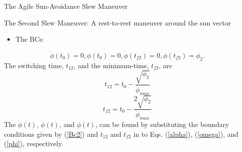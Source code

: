 \documentclass{beamer}
\begin{document}
\begin{frame}{The Agile Sun-Avoidance Slew Maneuver}
\begin{block}{The Second Slew Maneuver: A rest-to-rest maneuver around the sun vector}
\begin{itemize}
\item The BCs: 
\end{itemize}
\begin{equation}\label{Bc2}
\dot{\phi}(t_0)=0,\phi(t_0)=0, \dot{\phi}(t_{f2})=0,\phi(t_{f2})=\phi_2.
\end{equation}
 The switching time, $t_{12}$, and the minimum-time, $t_{f2}$, are
\begin{equation}\label{t21}
t_{12}=t_0-\frac{\sqrt{\phi_2}}{\ddot{\phi}_{max}}
\end{equation}
\begin{equation}\label{tf2}
t_{f2}=t_0-\frac{2\sqrt{\phi_2}}{\ddot{\phi}_{max}}
\end{equation}
The $\ddot{\phi}(t)$, $\dot{\phi}(t)$, and  $\phi(t)$,  can be found by substituting the boundary conditions given by (\ref{Bc2}) and $t_{12}$ and $t_{f2}$ in to Eqs. (\ref{alpha}), (\ref{omega}), and (\ref{phi}), respectively.
\end{block}
\end{frame}
\end{document}
